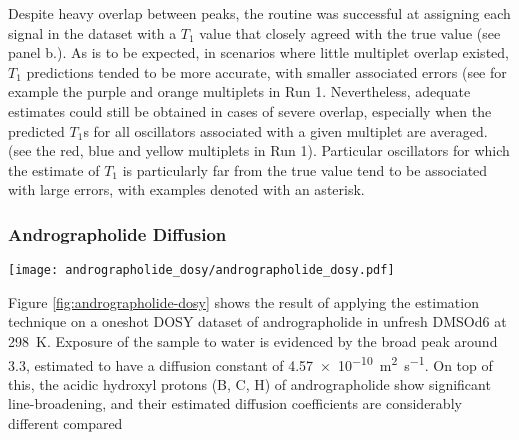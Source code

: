 Despite heavy overlap between peaks, the routine was successful at
assigning each signal in the dataset with a $T_1$ value that closely agreed
with the true value (see panel b.). As is to be expected, in scenarios where
little multiplet
overlap existed, $T_1$ predictions tended to be more accurate, with smaller
associated errors (see for example the purple and orange multiplets in Run 1.
Nevertheless, adequate estimates could still be obtained in cases of severe
overlap, especially when the predicted $T_1$s for all oscillators associated
with a given multiplet are averaged. (see the red, blue and yellow multiplets
in Run 1). Particular oscillators for which the estimate of $T_1$ is
particularly far from the true value tend to be associated with large errors,
with examples denoted with an asterisk.

\subsubsection{Andrographolide Diffusion}
\begin{sidewaysfigure}
    \centering
    \texttt{[image: andrographolide\_dosy/andrographolide\_dosy.pdf]}
    \caption[
        Result of estimating a Oneshot \acs{DOSY} dataset of andrographolide.
    ]{
        Result of estimating a Oneshot \ac{DOSY} dataset of andrographolide in
        unfresh \ac{DMSOd6}.
        \textbf{a.} \ac{1D} spectrum.
        \textbf{b.} Diffusion profile obtained by summing the contour plot in
        c. along the $x$-axis.
        \textbf{c.} Contour plot mapping estimated oscillators to diffusion constants, with
        $p_{\text{min}} = \qty{2e-10}{\meter\squared\per\second}$,
        $p_{\text{max}} = \qty{5e-10}{\meter\squared\per\second}$,
        $c = 2.5$,
        $R=128$.
        \textbf{d.} Magnified view of the \SIrange{2}{1.6}{\partspermillion}
        spectral range, with estimated oscillator peaks plotted.
    }
    \label{fig:andrographolide-dosy}
\end{sidewaysfigure}
Figure \ref{fig:andrographolide-dosy} shows the result of applying the
estimation technique on a oneshot \ac{DOSY} dataset of andrographolide in
unfresh \acs{DMSOd6} at \qty{298}{\kelvin}. Exposure of the sample to water is
evidenced by the broad
peak around \qty{3.3}{\partspermillion}, estimated to have a diffusion constant
of \qty{4.57e-10}{\meter\squared\per\second}. On top of this, the acidic
hydroxyl protons (B, C, H) of andrographolide show significant line-broadening,
and their estimated diffusion coefficients are considerably different compared
